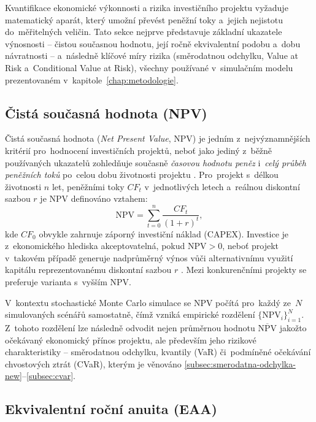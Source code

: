 Kvantifikace ekonomické výkonnosti a rizika investičního projektu
vyžaduje matematický aparát, který umožní převést peněžní toky a~jejich
nejistotu do~měřitelných veličin. Tato sekce nejprve představuje
základní ukazatele výnosnosti -- čistou současnou hodnotu, její ročně
ekvivalentní podobu a~dobu návratnosti -- a~následně klíčové míry rizika
(směrodatnou odchylku, Value at Risk a~Conditional Value at Risk),
všechny používané v~simulačním modelu prezentovaném v~kapitole~\ref{chap:metodologie}.

\subsection{Čistá současná hodnota (NPV)}
\label{sec:npv}

Čistá současná hodnota (\textit{Net Present Value}, NPV) je jedním
z~nejvýznamnějších kritérií pro~hodnocení investičních projektů,
neboť jako jediný z~běžně používaných ukazatelů zohledňuje současně
\textit{časovou hodnotu peněz} i~\textit{celý průběh peněžních toků}
po~celou dobu životnosti projektu \citep{BrealeyMyers2020,fotr_soucek_2011}.
Pro~projekt s~délkou životnosti $n$ let, peněžními toky $CF_t$
v~jednotlivých letech a~reálnou diskontní sazbou $r$ je NPV definováno
vztahem:
\begin{equation}
    \text{NPV} = \sum_{t=0}^{n} \frac{CF_t}{(1+r)^t},
    \label{eq:npv}
\end{equation}
kde $CF_0$ obvykle zahrnuje záporný investiční náklad (CAPEX).
Investice je z~ekonomického hlediska akceptovatelná, pokud
$\text{NPV} > 0$, neboť projekt v~takovém případě generuje
nadprůměrný výnos vůči alternativnímu využití kapitálu reprezentovanému
diskontní sazbou $r$ \citep{BrealeyMyers2020}. Mezi konkurenčními
projekty se preferuje varianta s~vyšším NPV.

V~kontextu stochastické Monte Carlo simulace se NPV počítá pro~každý
ze~$N$ simulovaných scénářů samostatně, čímž vzniká empirické rozdělení
$\{\text{NPV}_i\}_{i=1}^{N}$. Z~tohoto rozdělení lze následně odvodit
nejen průměrnou hodnotu $\overline{\text{NPV}}$ jakožto očekávaný
ekonomický přínos projektu, ale především jeho rizikové
charakteristiky -- směrodatnou odchylku, kvantily (VaR) či~podmíněné
očekávání chvostových ztrát (CVaR), kterým je věnováno
\autoref{subsec:smerodatna-odchylka-new}--\ref{subsec:cvar}.


\subsection{Ekvivalentní roční anuita (EAA)}
\label{sec:eaa_theory}


